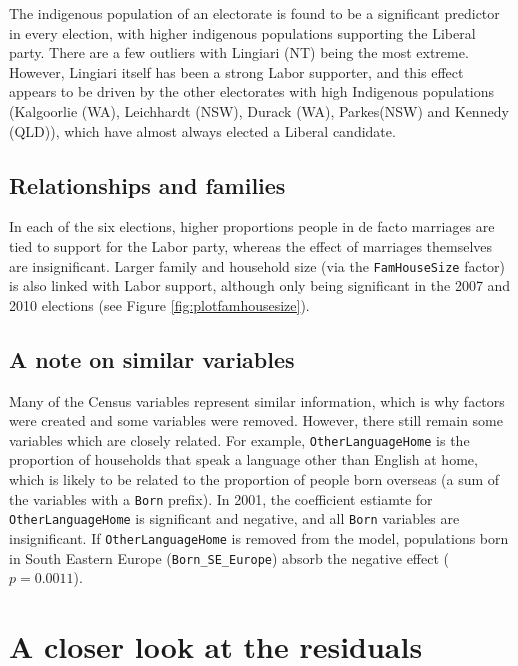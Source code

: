\documentclass[openany]{book}
\begin{document}
The indigenous population of an electorate is found to be a significant predictor in every election, with higher indigenous populations supporting the Liberal party. There are a few outliers with Lingiari (NT) being the most extreme. However, Lingiari itself has been a strong Labor supporter, and this effect appears to be driven by the other electorates with high Indigenous populations (Kalgoorlie (WA), Leichhardt (NSW), Durack (WA), Parkes(NSW) and Kennedy (QLD)), which have almost always elected a Liberal candidate.

\hypertarget{relationships-and-families}{%
\subsection{Relationships and families}\label{relationships-and-families}}

In each of the six elections, higher proportions people in de facto marriages are tied to support for the Labor party, whereas the effect of marriages themselves are insignificant. Larger family and household size (via the \texttt{FamHouseSize} factor) is also linked with Labor support, although only being significant in the 2007 and 2010 elections (see Figure \ref{fig:plotfamhousesize}).

\hypertarget{a-note-on-similar-variables}{%
\subsection{A note on similar variables}\label{a-note-on-similar-variables}}

Many of the Census variables represent similar information, which is why factors were created and some variables were removed. However, there still remain some variables which are closely related. For example, \texttt{OtherLanguageHome} is the proportion of households that speak a language other than English at home, which is likely to be related to the proportion of people born overseas (a sum of the variables with a \texttt{Born} prefix). In 2001, the coefficient estiamte for \texttt{OtherLanguageHome} is significant and negative, and all \texttt{Born} variables are insignificant. If \texttt{OtherLanguageHome} is removed from the model, populations born in South Eastern Europe (\texttt{Born\_SE\_Europe}) absorb the negative effect (\(p = 0.0011\)).

\hypertarget{a-closer-look-at-the-residuals}{%
\section{A closer look at the residuals}\label{a-closer-look-at-the-residuals}}
\end{document}
